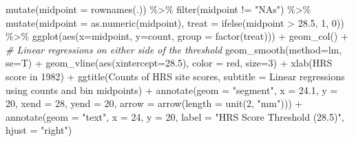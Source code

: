 \documentclass[
]{article}
\newenvironment{Shaded}{\begin{snugshade}}{\end{snugshade}}
\newcommand{\AttributeTok}[1]{\textcolor[rgb]{0.77,0.63,0.00}{#1}}
\newcommand{\CommentTok}[1]{\textcolor[rgb]{0.56,0.35,0.01}{\textit{#1}}}
\newcommand{\DecValTok}[1]{\textcolor[rgb]{0.00,0.00,0.81}{#1}}
\newcommand{\FloatTok}[1]{\textcolor[rgb]{0.00,0.00,0.81}{#1}}
\newcommand{\FunctionTok}[1]{\textcolor[rgb]{0.00,0.00,0.00}{#1}}
\newcommand{\NormalTok}[1]{#1}
\newcommand{\SpecialCharTok}[1]{\textcolor[rgb]{0.00,0.00,0.00}{#1}}
\newcommand{\StringTok}[1]{\textcolor[rgb]{0.31,0.60,0.02}{#1}}
\begin{document}
\begin{Shaded}
\begin{Highlighting}[]
    \FunctionTok{mutate}\NormalTok{(}\AttributeTok{midpoint =} \FunctionTok{rownames}\NormalTok{(.)) }\SpecialCharTok{\%\textgreater{}\%}
    \FunctionTok{filter}\NormalTok{(midpoint }\SpecialCharTok{!=} \StringTok{"NA\textquotesingle{}s"}\NormalTok{) }\SpecialCharTok{\%\textgreater{}\%}
    \FunctionTok{mutate}\NormalTok{(}\AttributeTok{midpoint =} \FunctionTok{as.numeric}\NormalTok{(midpoint),}
           \AttributeTok{treat =} \FunctionTok{ifelse}\NormalTok{(midpoint }\SpecialCharTok{\textgreater{}} \FloatTok{28.5}\NormalTok{, }\DecValTok{1}\NormalTok{, }\DecValTok{0}\NormalTok{)) }\SpecialCharTok{\%\textgreater{}\%}
    \FunctionTok{ggplot}\NormalTok{(}\FunctionTok{aes}\NormalTok{(}\AttributeTok{x=}\NormalTok{midpoint, }\AttributeTok{y=}\NormalTok{count, }\AttributeTok{group =} \FunctionTok{factor}\NormalTok{(treat))) }\SpecialCharTok{+} \FunctionTok{geom\_col}\NormalTok{() }\SpecialCharTok{+}
    \CommentTok{\# Linear regressions on either side of the threshold}
    \FunctionTok{geom\_smooth}\NormalTok{(}\AttributeTok{method=}\NormalTok{lm, }\AttributeTok{se=}\NormalTok{T) }\SpecialCharTok{+}
    \FunctionTok{geom\_vline}\NormalTok{(}\FunctionTok{aes}\NormalTok{(}\AttributeTok{xintercept=}\FloatTok{28.5}\NormalTok{), }\AttributeTok{color =} \StringTok{\textquotesingle{}red\textquotesingle{}}\NormalTok{, }\AttributeTok{size=}\DecValTok{3}\NormalTok{) }\SpecialCharTok{+}
    \FunctionTok{xlab}\NormalTok{(}\StringTok{\textquotesingle{}HRS score in 1982\textquotesingle{}}\NormalTok{) }\SpecialCharTok{+}
    \FunctionTok{ggtitle}\NormalTok{(}\StringTok{\textquotesingle{}Counts of HRS site scores\textquotesingle{}}\NormalTok{, }\AttributeTok{subtitle =} \StringTok{\textquotesingle{}Linear regressions using counts and bin midpoints\textquotesingle{}}\NormalTok{) }\SpecialCharTok{+}
    \FunctionTok{annotate}\NormalTok{(}\AttributeTok{geom =} \StringTok{"segment"}\NormalTok{, }\AttributeTok{x =} \FloatTok{24.1}\NormalTok{, }\AttributeTok{y =} \DecValTok{20}\NormalTok{, }\AttributeTok{xend =} \DecValTok{28}\NormalTok{, }\AttributeTok{yend =} \DecValTok{20}\NormalTok{,}
             \AttributeTok{arrow =} \FunctionTok{arrow}\NormalTok{(}\AttributeTok{length =} \FunctionTok{unit}\NormalTok{(}\DecValTok{2}\NormalTok{, }\StringTok{"mm"}\NormalTok{))) }\SpecialCharTok{+}
    \FunctionTok{annotate}\NormalTok{(}\AttributeTok{geom =} \StringTok{"text"}\NormalTok{, }\AttributeTok{x =} \DecValTok{24}\NormalTok{, }\AttributeTok{y =} \DecValTok{20}\NormalTok{, }
             \AttributeTok{label =} \StringTok{"HRS Score Threshold (28.5)"}\NormalTok{, }
             \AttributeTok{hjust =} \StringTok{"right"}\NormalTok{)}


\end{Highlighting}
\end{Shaded}
\end{document}
